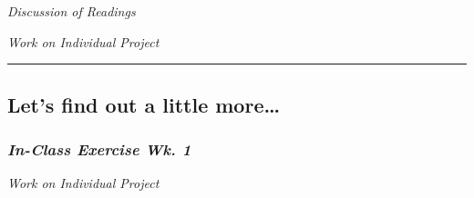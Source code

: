 \documentclass[
  letterpaper,
  DIV=11,
  numbers=noendperiod]{scrartcl}
\begin{document}
\emph{Discussion of Readings}

\emph{Work on Individual Project}

\begin{center}\rule{0.5\linewidth}{0.5pt}\end{center}

\hypertarget{lets-find-out-a-little-more}{%
\subsection{Let's find out a little
more\ldots{}}\label{lets-find-out-a-little-more}}

\hypertarget{in-class-exercise-wk.-1}{%
\subsubsection{\texorpdfstring{\emph{In-Class Exercise Wk.
1}}{In-Class Exercise Wk. 1}}\label{in-class-exercise-wk.-1}}

\emph{Work on Individual Project}
\end{document}

